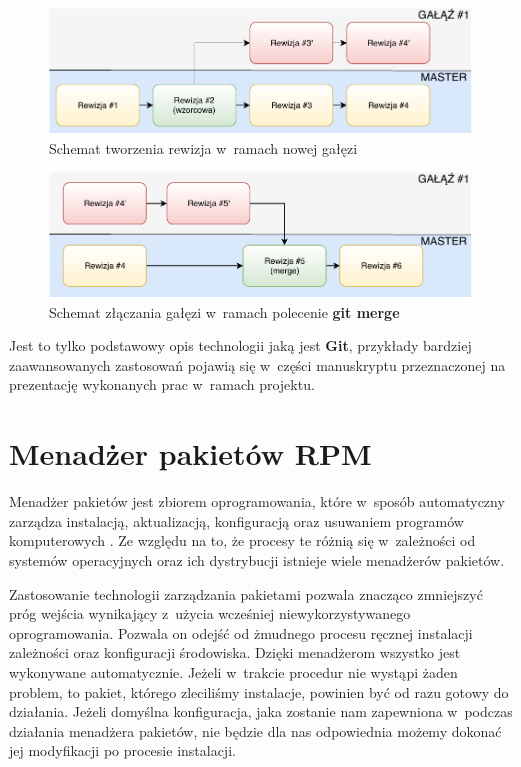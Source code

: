\begin{figure} [H]
\centering
\includegraphics[width=\textwidth]{res/branch}
\caption{Schemat tworzenia rewizja w~ramach nowej gałęzi}
\label{fig:branch}
\end{figure}

\begin{figure} [H]
\centering
\includegraphics[width=\textwidth]{res/branchMerge}
\caption{Schemat złączania gałęzi w~ramach polecenie \textbf{git merge}}
\label{fig:branch2}
\end{figure}

Jest to tylko podstawowy opis technologii jaką jest \textbf{Git}, przykłady bardziej zaawansowanych zastosowań pojawią się w~części manuskryptu przeznaczonej na prezentację wykonanych prac w~ramach projektu.


\section{Menadżer pakietów RPM}
Menadżer pakietów jest zbiorem oprogramowania, które w~sposób automatyczny zarządza instalacją, aktualizacją, konfiguracją oraz usuwaniem programów komputerowych \cite{ManagerWiki}. Ze względu na to, że procesy te różnią się w~zależności od systemów operacyjnych oraz ich dystrybucji istnieje wiele menadżerów pakietów.\par

Zastosowanie technologii zarządzania pakietami pozwala znacząco zmniejszyć próg wejścia wynikający z~użycia wcześniej niewykorzystywanego oprogramowania. Pozwala on odejść od żmudnego procesu ręcznej instalacji zależności oraz konfiguracji środowiska. Dzięki menadżerom wszystko jest wykonywane automatycznie. Jeżeli w~trakcie procedur nie wystąpi żaden problem, to pakiet, którego zleciliśmy instalacje, powinien być od razu gotowy do działania. Jeżeli domyślna konfiguracja, jaka zostanie nam zapewniona w~podczas działania menadżera pakietów, nie będzie dla nas odpowiednia możemy dokonać jej modyfikacji po procesie instalacji.

